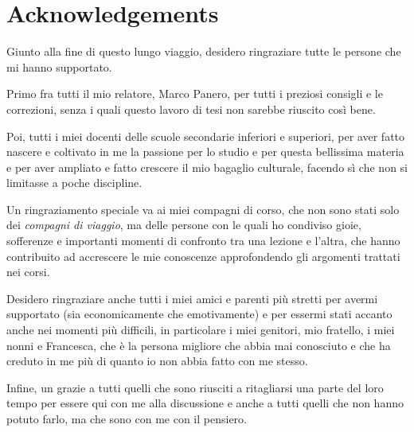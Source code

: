 \pagestyle{solopagina}
\renewcommand{\headrulewidth}{0.0pt}
\fancyhead{}
\fancyfoot{}

\section*{Acknowledgements}

Giunto alla fine di questo lungo viaggio, desidero ringraziare tutte le persone che mi hanno supportato.

Primo fra tutti il mio relatore, Marco Panero, per tutti i preziosi consigli e le correzioni, senza i quali questo lavoro di tesi non sarebbe riuscito così bene.

Poi, tutti i miei docenti delle scuole secondarie inferiori e superiori, per aver fatto nascere e coltivato in me la passione per lo studio e per questa bellissima materia e per aver ampliato e fatto crescere il mio bagaglio culturale, facendo sì che non si limitasse a poche discipline.

Un ringraziamento speciale va ai miei compagni di corso, che non sono stati solo dei \emph{compagni di viaggio}, ma delle persone con le quali ho condiviso gioie, sofferenze e importanti momenti di confronto tra una lezione e l'altra, che hanno contribuito ad accrescere le mie conoscenze approfondendo gli argomenti trattati nei corsi.

Desidero ringraziare anche tutti i miei amici e parenti più stretti per avermi supportato (sia economicamente che emotivamente) e per essermi stati accanto anche nei momenti più difficili, in particolare i miei genitori, mio fratello, i miei nonni e Francesca, che è la persona migliore che abbia mai conosciuto e che ha creduto in me più di quanto io non abbia fatto con me stesso.

Infine, un grazie a tutti quelli che sono riusciti a ritagliarsi una parte del loro tempo per essere qui con me alla discussione e anche a tutti quelli che non hanno potuto farlo, ma che sono con me con il pensiero.
